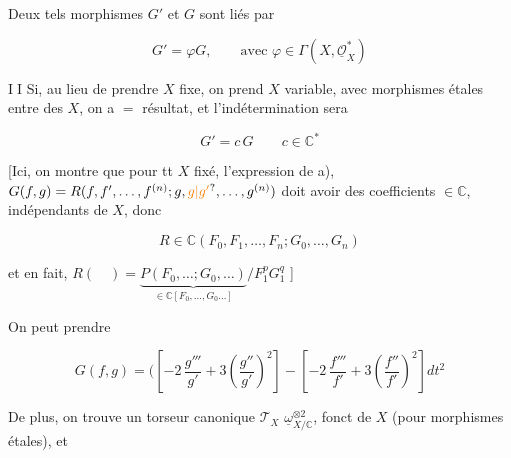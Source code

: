 
Deux tels morphismes $G'$ et $G$ sont liés par

\[
G'=\varphi G,\qquad\text{avec }\varphi\in\Gamma(X,\underline{\mathcal O}_X^*)
\]

\textcircled{II} Si, au lieu de prendre $X$ fixe, on prend $X$ variable, avec morphismes étales entre des $X$, on a $=$ résultat, et l'indétermination sera


\[
G'=c\,G\qquad c\in\mathbb C^*
\]



[Ici, on montre que  pour tt $X$ fixé, l'expression de a), $G(f,g)=R(f,f',\ldots,f^{(n)};g,\unsure{g|g'},\ldots,g^{(n)})$ doit avoir des coefficients $\in\mathbb C$, indépendants de $X$, donc

\[
R\in\mathbb C(F_0,F_1,\ldots,F_n;G_0,\ldots,G_n)
\]

et en fait, $R(\quad)=\underbrace{P(F_0,\ldots;G_0,\ldots)}_{\in\mathbb C[F_0,\ldots,G_0\ldots]}/F_1^p G_1^q$ \hfill ]

On peut prendre

\[
G(f,g)=\biggl(\left[-2\,\frac{g'''}{g'}+3\left(\frac{g''}{g'}\right)^2\right]-
 \left[-2\,\frac{f'''}{f'}+3\left(\frac{f''}{f'}\right)^2\right]dt^2
\]

De plus, on trouve un torseur canonique $\mathcal T_X$  $\underline\omega^{\otimes2}_{X/\mathbb C}$,  fonct de $X$ (pour morphismes étales), et

